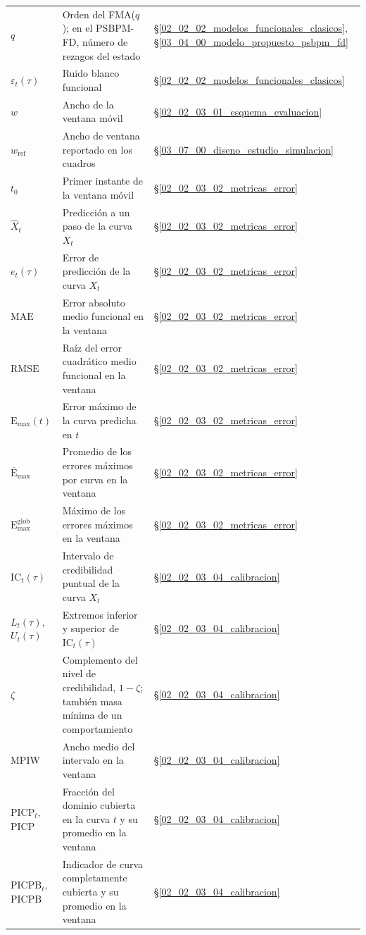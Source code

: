 \begin{longtable}{p{} p{} p{}}
$q$ & Orden del FMA($q$); en el PSBPM-FD, número de rezagos del estado & \S\ref{02_02_02_modelos_funcionales_clasicos}, \S\ref{03_04_00_modelo_propuesto_psbpm_fd} \\
$\varepsilon_t(\tau)$ & Ruido blanco funcional & \S\ref{02_02_02_modelos_funcionales_clasicos} \\
$w$ & Ancho de la ventana móvil & \S\ref{02_02_03_01_esquema_evaluacion} \\
$w_{\mathrm{ref}}$ & Ancho de ventana reportado en los cuadros & \S\ref{03_07_00_diseno_estudio_simulacion} \\
$t_0$ & Primer instante de la ventana móvil & \S\ref{02_02_03_02_metricas_error} \\
$\widehat{X}_t$ & Predicción a un paso de la curva $X_t$ & \S\ref{02_02_03_02_metricas_error} \\
$e_t(\tau)$ & Error de predicción de la curva $X_t$ & \S\ref{02_02_03_02_metricas_error} \\
$\mathrm{MAE}$ & Error absoluto medio funcional en la ventana & \S\ref{02_02_03_02_metricas_error} \\
$\mathrm{RMSE}$ & Raíz del error cuadrático medio funcional en la ventana & \S\ref{02_02_03_02_metricas_error} \\
$\mathrm{E}_{\max}(t)$ & Error máximo de la curva predicha en $t$ & \S\ref{02_02_03_02_metricas_error} \\
$\overline{\mathrm{E}}_{\max}$ & Promedio de los errores máximos por curva en la ventana & \S\ref{02_02_03_02_metricas_error} \\
$\mathrm{E}_{\max}^{\mathrm{glob}}$ & Máximo de los errores máximos en la ventana & \S\ref{02_02_03_02_metricas_error} \\
$\mathrm{IC}_t(\tau)$ & Intervalo de credibilidad puntual de la curva $X_t$ & \S\ref{02_02_03_04_calibracion} \\
$L_t(\tau)$, $U_t(\tau)$ & Extremos inferior y superior de $\mathrm{IC}_t(\tau)$ & \S\ref{02_02_03_04_calibracion} \\
$\zeta$ & Complemento del nivel de credibilidad, $1 - \zeta$; también masa mínima de un comportamiento & \S\ref{02_02_03_04_calibracion} \\
$\mathrm{MPIW}$ & Ancho medio del intervalo en la ventana & \S\ref{02_02_03_04_calibracion} \\
$\mathrm{PICP}_t$, $\mathrm{PICP}$ & Fracción del dominio cubierta en la curva $t$ y su promedio en la ventana & \S\ref{02_02_03_04_calibracion} \\
$\mathrm{PICPB}_t$, $\mathrm{PICPB}$ & Indicador de curva completamente cubierta y su promedio en la ventana & \S\ref{02_02_03_04_calibracion} \\

\end{longtable}
